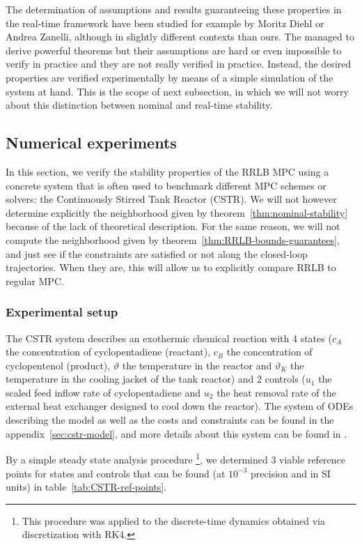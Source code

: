 \documentclass[12pt]{article}
\begin{document}
The determination of assumptions and results guaranteeing these properties in the real-time framework have been studied for example by Moritz Diehl or Andrea Zanelli, although in slightly different contexts than ours.
The managed to derive powerful theorems but their assumptions are hard or even impossible to verify in practice and they are not really verified in practice.
Instead, the desired properties are verified experimentally by means of a simple simulation of the system at hand.
This is the scope of next subsection, in which we will not worry about this distinction between nominal and real-time stability.


\subsection{Numerical experiments}\label{sec:RRLB-numerical-experiments}

In this section, we verify the stability properties of the RRLB MPC using a concrete system that is often used to benchmark different MPC schemes or solvers: the Continuously Stirred Tank Reactor (CSTR).
We will not however determine explicitly the neighborhood given by theorem~\ref{thm:nominal-stability} because of the lack of theoretical description.
For the same reason, we will not compute the neighborhood given by theorem~\ref{thm:RRLB-bounds-guarantees}, and just see if the constraints are satisfied or not along the closed-loop trajectories.
When they are, this will allow us to explicitly compare RRLB to regular MPC.

\subsubsection{Experimental setup}

The CSTR system describes an exothermic chemical reaction with 4 states ($c_A$ the concentration of cyclopentadiene (reactant), $c_B$ the concentration of cyclopentenol (product), $\vartheta$ the temperature in the reactor and $\vartheta_K$ the temperature in the cooling jacket of the tank reactor) and 2 controls ($u_1$ the scaled feed inflow rate of cyclopentadiene and $u_2$ the heat removal rate of the external heat exchanger designed to cool down the reactor).
The system of ODEs describing the model as well as the costs and constraints can be found in the appendix~\ref{sec:cstr-model}, and more details about this system can be found in \cite{diehl-dissertation}.

By a simple steady state analysis procedure \footnote{This procedure was applied to the discrete-time dynamics obtained via discretization with RK4.}, we determined 3 viable reference points for states and controls that can be found (at $10^{-3}$ precision and in SI units) in table~\ref{tab:CSTR-ref-points}.
\end{document}
